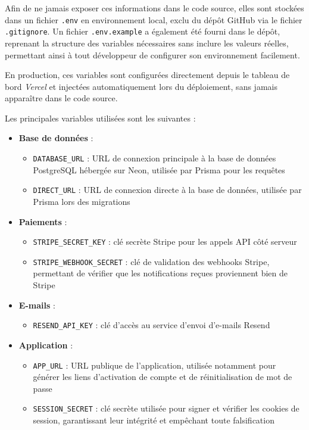 \documentclass{article}
\begin{document}
Afin de ne jamais exposer ces informations dans le code source, 
elles sont stockées dans un fichier \texttt{.env} en environnement 
local, exclu du dépôt GitHub via le fichier \texttt{.gitignore}. 
Un fichier \texttt{.env.example} a également été fourni dans le 
dépôt, reprenant la structure des variables nécessaires sans 
inclure les valeurs réelles, permettant ainsi à tout développeur 
de configurer son environnement facilement.

En production, ces variables sont configurées directement depuis 
le tableau de bord \textit{Vercel} et injectées automatiquement 
lors du déploiement, sans jamais apparaître dans le code source.

Les principales variables utilisées sont les suivantes :

\begin{itemize}
    \item \textbf{Base de données} :
    \begin{itemize}
        \item \texttt{DATABASE\_URL} : URL de connexion principale 
        à la base de données PostgreSQL hébergée sur Neon, utilisée 
        par Prisma pour les requêtes
        \item \texttt{DIRECT\_URL} : URL de connexion directe à 
        la base de données, utilisée par Prisma lors des migrations
    \end{itemize}

    \item \textbf{Paiements} :
    \begin{itemize}
        \item \texttt{STRIPE\_SECRET\_KEY} : clé secrète Stripe 
        pour les appels API côté serveur
        \item \texttt{STRIPE\_WEBHOOK\_SECRET} : clé de validation 
        des webhooks Stripe, permettant de vérifier que les 
        notifications reçues proviennent bien de Stripe
    \end{itemize}

    \item \textbf{E-mails} :
    \begin{itemize}
        \item \texttt{RESEND\_API\_KEY} : clé d'accès au service 
        d'envoi d'e-mails Resend
    \end{itemize}

    \item \textbf{Application} :
    \begin{itemize}
        \item \texttt{APP\_URL} : URL publique de l'application, 
        utilisée notamment pour générer les liens d'activation 
        de compte et de réinitialisation de mot de passe
        \item \texttt{SESSION\_SECRET} : clé secrète utilisée 
        pour signer et vérifier les cookies de session, garantissant 
        leur intégrité et empêchant toute falsification
    \end{itemize}
\end{itemize}
\end{document}
